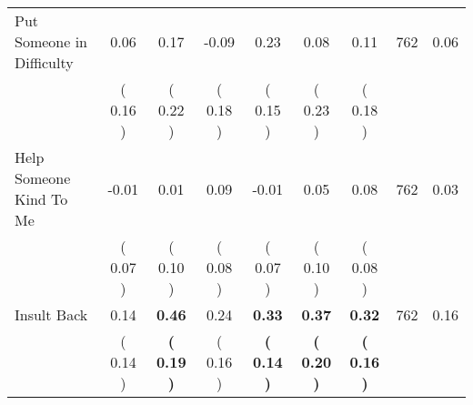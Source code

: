 \begin{tabular}{lcccccccc}
Put Someone in Difficulty &      0.06 &      0.17 &     -0.09 &      0.23 &      0.08 &      0.11 & 762 &       0.06 \\ 
 & (     0.16 ) & (     0.22 ) & (     0.18 ) & (     0.15 ) & (     0.23 ) & (     0.18 ) & \\
Help Someone Kind To Me &     -0.01 &      0.01 &      0.09 &     -0.01 &      0.05 &      0.08 & 762 &       0.03 \\ 
 & (     0.07 ) & (     0.10 ) & (     0.08 ) & (     0.07 ) & (     0.10 ) & (     0.08 ) & \\
Insult Back &      0.14 & \textbf{     0.46} &      0.24 & \textbf{     0.33} & \textbf{     0.37} & \textbf{     0.32} & 762 &       0.16 \\ 
 & (     0.14 ) & \textbf{(     0.19 )} & (     0.16 ) & \textbf{(     0.14 )} & \textbf{(     0.20 )} & \textbf{(     0.16 )} & \\
\bottomrule
\end{tabular}
